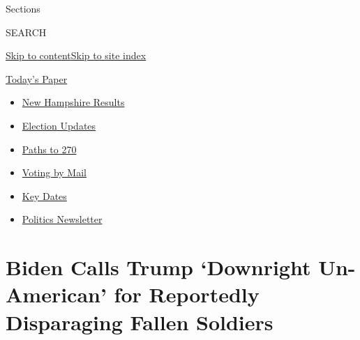 Sections

SEARCH

\protect\hyperlink{site-content}{Skip to
content}\protect\hyperlink{site-index}{Skip to site index}

\href{https://myaccount.nytimes3xbfgragh.onion/auth/login?response_type=cookie\&client_id=vi}{}

\href{https://www.nytimes3xbfgragh.onion/section/todayspaper}{Today's
Paper}

\begin{itemize}
\item
  \href{https://www.nytimes3xbfgragh.onion/interactive/2020/09/08/us/elections/results-new-hampshire-primary-elections.html?action=click\&pgtype=Article\&state=default\&region=TOP_BANNER\&context=storylines_menu}{New
  Hampshire Results}
\item
  \href{https://www.nytimes3xbfgragh.onion/live/2020/09/08/us/trump-vs-biden?action=click\&pgtype=Article\&state=default\&region=TOP_BANNER\&context=storylines_menu}{Election
  Updates}
\item
  \href{https://www.nytimes3xbfgragh.onion/interactive/2020/us/elections/election-states-biden-trump.html?action=click\&pgtype=Article\&state=default\&region=TOP_BANNER\&context=storylines_menu}{Paths
  to 270}
\item
  \href{https://www.nytimes3xbfgragh.onion/interactive/2020/08/31/us/politics/vote-by-mail-deadlines.html?action=click\&pgtype=Article\&state=default\&region=TOP_BANNER\&context=storylines_menu}{Voting
  by Mail}
\item
  \href{https://www.nytimes3xbfgragh.onion/interactive/2019/us/elections/2020-presidential-election-calendar.html?action=click\&pgtype=Article\&state=default\&region=TOP_BANNER\&context=storylines_menu}{Key
  Dates}
\item
  \href{https://www.nytimes3xbfgragh.onion/newsletters/politics?action=click\&pgtype=Article\&state=default\&region=TOP_BANNER\&context=storylines_menu}{Politics
  Newsletter}
\end{itemize}

\hypertarget{biden-calls-trump-downright-un-american-for-reportedly-disparaging-fallen-soldiers}{%
\section{Biden Calls Trump `Downright Un-American' for Reportedly
Disparaging Fallen
Soldiers}\label{biden-calls-trump-downright-un-american-for-reportedly-disparaging-fallen-soldiers}}

